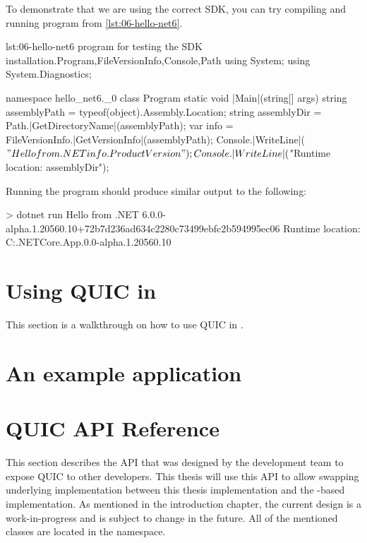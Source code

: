 To demonstrate that we are using the correct SDK, you can try compiling and running program from
\autoref{lst:06-hello-net6}.

\begin{myListingCsharp}{lst:06-hello-net6}{\csharp{} program for testing the SDK installation.}{Program,FileVersionInfo,Console,Path}{}
using System;
using System.Diagnostics;

namespace hello_net6._0
{
    class Program
    {
        static void |Main|(string[] args)
        {
            string assemblyPath = typeof(object).Assembly.Location;
            string assemblyDir = Path.|GetDirectoryName|(assemblyPath);
            var info = FileVersionInfo.|GetVersionInfo|(assemblyPath);
            Console.|WriteLine|($"Hello from .NET {info.ProductVersion}");
            Console.|WriteLine|($"Runtime location: {assemblyDir}");
        }
    }
}
\end{myListingCsharp}

Running the program should produce similar output to the following:

\begin{myVerbatim}
> dotnet run
Hello from .NET 6.0.0-alpha.1.20560.10+72b7d236ad634c2280c73499ebfc2b594995ec06
Runtime location: C:\dotnet\shared\Microsoft.NETCore.App\6.0.0-alpha.1.20560.10
\end{myVerbatim}

\section{Using QUIC in \dotnet{}}

This section is a walkthrough on how to use QUIC in \dotnet{}.


\section{An example application}


\section{QUIC API Reference}\label{sec:06-api}

This section describes the API that was designed by the \dotnet{} development team to expose QUIC to
other developers. This thesis will use this API to allow swapping underlying implementation between
this thesis implementation and the \libmsquic{}-based implementation. As mentioned in the
introduction chapter, the current design is a work-in-progress and is subject to change in the
future. All of the mentioned classes are located in the  namespace.

